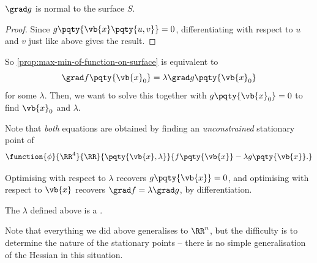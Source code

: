 \begin{lemma}
    \label{lem:gradient-perpendicular-level-surface}%
    \(\grad g\) is normal to the surface \(S\).
\end{lemma}

\begin{proof}
    Since \(g\pqty{\vb{x} \pqty{u, v}} = 0\), differentiating with respect to \(u\) and \(v\) just like above gives the result.
\end{proof}

So \autoref{prop:max-min-of-function-on-surface} is equivalent to
\[
    \grad f\pqty{\vb{x}_0} = \lambda \grad g\pqty{\vb{x}_0}
\]
for some \(\lambda\). Then, we want to solve this together with \(g\pqty{\vb{x}_0} = 0\) to find \(\vb{x}_0\) and \(\lambda\).

Note that \emph{both} equations are obtained by finding an \emph{unconstrained} stationary point of
\[
    \function{\phi}{\RR^4}{\RR}{\pqty{\vb{x}, \lambda}}{f\pqty{\vb{x}} - \lambda g\pqty{\vb{x}}.}
\]

Optimising with respect to \(\lambda\) recovers \(g\pqty{\vb{x}} = 0\), and optimising with respect to \(\vb{x}\) recovers \(\grad f = \lambda \grad g\), by differentiation.

\begin{definition}
    \label{def:lagrange-multiplier}%
    The \(\lambda\) defined above is a .
\end{definition}

Note that everything we did above generalises to \(\RR^n\), but the difficulty is to determine the nature of the stationary points -- there is no simple generalisation of the Hessian in this situation.

